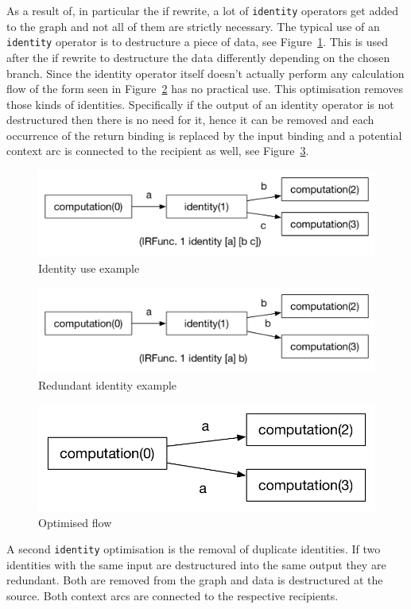 As a result of, in particular the if rewrite, a lot of \texttt{identity} operators get added to the graph and not all of them are strictly necessary.
The typical use of an \texttt{identity} operator is to destructure a piece of data, see Figure~\ref{fig:identity-example}.
This is used after the if rewrite to destructure the data differently  depending on the chosen branch.
Since the identity operator itself doesn't actually perform any calculation flow of the form seen in Figure~\ref{fig:redundant-identity-example} has no practical use.
This optimisation removes those kinds of identities.
Specifically if the output of an identity operator is not destructured then there is no need for it, hence it can be removed and each occurrence of the return binding is replaced by the input binding and a potential context arc is connected to the recipient as well, see Figure~\ref{fig:redundant-identity-example-rewritten}.

\begin{figure}
    \includegraphics[width=\linewidth]{../Figures/identity-example}
    \caption{Identity use example}
    \label{fig:identity-example}
\end{figure}

\begin{figure}
    \includegraphics[width=\linewidth]{../Figures/redundant-identity-example}
    \caption{Redundant identity example}
    \label{fig:redundant-identity-example}
\end{figure}

\begin{figure}
    \includegraphics[width=\linewidth]{../Figures/redundant-identity-example-rewritten}
    \caption{Optimised flow}
    \label{fig:redundant-identity-example-rewritten}
\end{figure}

A second \texttt{identity} optimisation is the removal of duplicate identities.
If two identities with the same input are destructured into the same output they are redundant.
Both are removed from the graph and data is destructured at the source.
Both context arcs are connected to the respective recipients.

